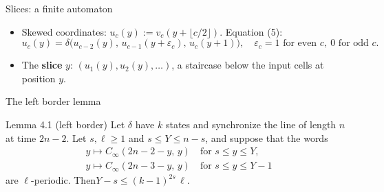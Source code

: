 \begin{frame}{Slices: a finite automaton}
\begin{itemize}
\item Skewed coordinates: $u_c(y):=v_c(y+\lfloor c/2\rfloor)$. Equation (5):
\[u_c(y)=\delta\bigl(u_{c-2}(y),\,u_{c-1}(y+\varepsilon_c),\,u_c(y+1)\bigr),\quad \varepsilon_c=1\text{ for even }c,\ 0\text{ for odd }c.\]
\item The \textbf{slice} $y$: $(u_1(y),u_2(y),\dots)$, a staircase below the input cells at position $y$.
\end{itemize}
\vspace{1ex}
\begin{center}
\end{center}
\end{frame}

\begin{frame}{The left border lemma}
\vspace{2ex}
\begin{statement}{Lemma 4.1 (left border)}
Let $\delta$ have $k$ states and synchronize the line of length $n$ at time $2n-2$. Let $s,\ell\ge1$ and $s\le Y\le n-s$, and suppose that the words
\begin{gather*}y\mapsto C_\infty(2n-2-y,\,y)\quad\text{for } s\le y\le Y,\\ y\mapsto C_\infty(2n-3-y,\,y)\quad\text{for } s\le y\le Y-1\end{gather*}
are $\ell$-periodic. Then\qquad $Y-s\le(k-1)^{2s}\,\ell$.
\end{statement}
\end{frame}


